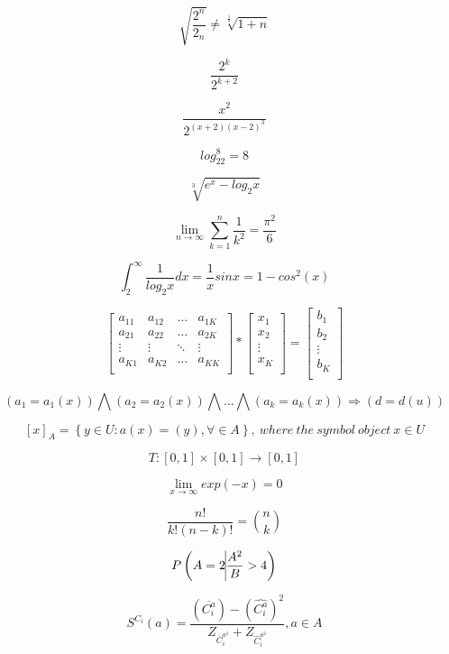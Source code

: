 \documentclass{article}
\begin{document}
$$ \sqrt{\frac{2^n}{2_n}} \neq \sqrt[\frac{1}{3}]{1+n} $$ 

$$ \frac{2^k}{2^{k+2}} $$ 

$$ \frac{x^2}{2^{\left(x+2\right)\left(x-2\right)^3}} $$ 

$$ log_22^8 = 8 $$ 

$$ \sqrt[3]{e^x-log_2x} $$ 

$$ \lim_{n \rightarrow \infty} \sum_{k=1}^n \frac{1}{k^2} = \frac{\pi^2}{6} $$ 

$$ \int_2^\infty \frac{1}{log_2x}dx = \frac{1}{x}sin x = 1 - cos^2\left(x\right) $$

$$ \left[ \begin{array}{cccc}
a_{11} & a_{12} & \ldots & a_{1K} \\
a_{21} & a_{22} & \ldots & a_{2K} \\
\vdots & \vdots & \ddots & \vdots \\
a_{K1} & a_{K2} & \ldots & a_{KK} \\
\end{array} \right] *
\left[ \begin{array}{c}
x_{1} \\
x_{2} \\
\vdots \\
x_{K} \\
\end{array} \right] =
\left[ \begin{array}{c}
b_{1} \\
b_{2} \\
\vdots \\
b_{K} \\
\end{array} \right]$$ 

$$ \left(a_1 = a_1\left(x\right)\right) 
\bigwedge 
\left(a_2 = a_2\left(x\right)\right) 
\bigwedge \ldots \bigwedge
\left(a_k = a_k\left(x\right)\right)
\Rightarrow
\left(d = d\left(u\right)\right) $$ 

$$ \left[x\right]_A = \left\lbrace y \in U : a \left(x\right) = \left(y\right), \forall \in A \right\rbrace
,\:where\:the\:symbol\:object\:x \in U $$ 

$$ T : \left[0,1\right] \times \left[0,1\right] \rightarrow \left[0,1\right] $$ 

$$ \lim_{x\rightarrow\infty} exp \left(-x\right) = 0 $$

$$ \frac{n!}{k!\left(n - k\right)!} = {n \choose k} $$ 

$$ P\left( A = 2 \vline \frac{A^2}{B} > 4 \right) $$ 

$$ S^{C_i}\left(a\right) = \frac{\left(\overline{C_i^a}\right) - \left( \hat{C_i^a} \right)^2}{Z_{\overline{C}_i^{a^2}} + Z_{\hat{C}_i^{a^2}}}, a \in A $$
\end{document}
